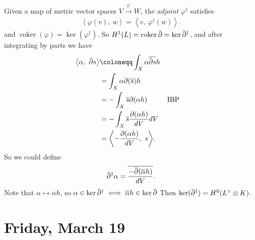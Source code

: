 \begin{remark}

Given a map of metric vector spaces \(V \xrightarrow{\varphi} W\), the
\emph{adjoint} \(\varphi^\dagger\) satisfies
\begin{align*}
{\left\langle { \varphi(v) },~{w} \right\rangle} = {\left\langle {v},~{ \varphi^\dagger(w)} \right\rangle}
.\end{align*}
and \(\operatorname{coker}( \varphi) = \ker( \varphi^\dagger)\). So
\(H^1(L) = \operatorname{coker}\mkern 1.5mu\overline{\mkern-1.5mu{\partial}\mkern-1.5mu}\mkern 1.5mu= \ker \mkern 1.5mu\overline{\mkern-1.5mu{\partial}\mkern-1.5mu}\mkern 1.5mu^\dagger\),
and after integrating by parts we have
\begin{align*}
{\left\langle { \alpha},~{ \mkern 1.5mu\overline{\mkern-1.5mu{\partial}\mkern-1.5mu}\mkern 1.5mus} \right\rangle} 
&\coloneqq\int_X \alpha{\overline{{ \mkern 1.5mu\overline{\mkern-1.5mu{\partial}\mkern-1.5mu}\mkern 1.5mus }}} h \\
&= \int_X \alpha{\partial}({\overline{{s}}}) h \\
&= -\int_X {\overline{{s}}} {\partial}( \alpha h) && \text{IBP} \\
&= -\int_X {\overline{{s}}} {{\partial}(\alpha h) \over dV} dV \\
&= {\left\langle { - { {\partial}( \alpha h ) \over dV}},~{s} \right\rangle}
.\end{align*}
So we could define
\begin{align*}
\mkern 1.5mu\overline{\mkern-1.5mu{\partial}\mkern-1.5mu}\mkern 1.5mu^\dagger \alpha = {\overline{{- {\mkern 1.5mu\overline{\mkern-1.5mu{\partial}\mkern-1.5mu}\mkern 1.5mu({\overline{{\alpha}}} h )} \over dV }}}
.\end{align*}
Note that \(\alpha\mapsto {\overline{{ \alpha}}} h\), so
\(\alpha\in \ker \mkern 1.5mu\overline{\mkern-1.5mu{\partial}\mkern-1.5mu}\mkern 1.5mu^\dagger \iff {\overline{{ \alpha}}}h\in \ker \mkern 1.5mu\overline{\mkern-1.5mu{\partial}\mkern-1.5mu}\mkern 1.5mu\)
Then
\(\ker (\mkern 1.5mu\overline{\mkern-1.5mu{\partial}\mkern-1.5mu}\mkern 1.5mu^\dagger) = H^0(L^\vee\otimes K)\).

\end{remark}

\hypertarget{friday-march-19}{%
\section{Friday, March 19}\label{friday-march-19}}

